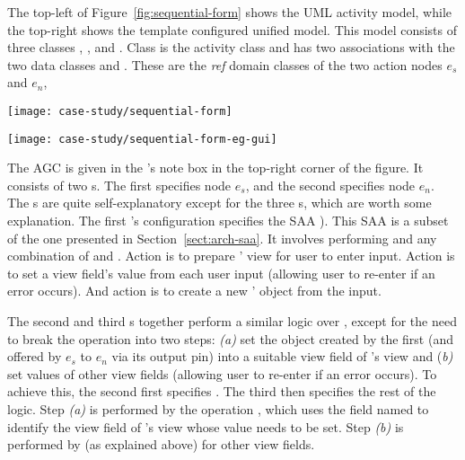 The top-left of Figure~\ref{fig:sequential-form} shows the UML activity model, while the top-right shows the template configured unified model.
This model consists of three classes , , and . Class  is the activity class and has two associations with the two data classes  and . These are the \textit{ref} domain classes of the two action nodes $ e_s $ and $ e_n $, \resp

\begin{figure*}[ht]
\begin{center}
\texttt{[image: case-study/sequential-form]}
\end{center}
\caption{The sequential pattern form.} %
\label{fig:sequential-form}
\end{figure*}
%
\begin{figure*}[ht]
\begin{center}
\texttt{[image: case-study/sequential-form-eg-gui]}
\end{center}
\caption{The sequential pattern form view of enrolment management activity.} %
\label{fig:sequential-form-eg-gui}
\end{figure*}

The AGC is given in the 's note box in the top-right corner of the figure. It consists of two s. The first  specifies node $ e_s $, and the second specifies node $ e_n $. The s are quite self-explanatory except for the three s, which are worth some explanation. The first 's configuration specifies the SAA ). This SAA is a subset of the one presented in Section~\ref{sect:arch-saa}. It involves performing  and any combination of  and . Action  is to prepare ' view for user to enter input. Action  is to set a view field's value from each user input (allowing user to re-enter if an error occurs). And action  is to create a new ' object from the input.

The second and third s together perform a similar logic over , except for the need to break the  operation into two steps: \textit{(a)} set the  object created by the first  (and offered by $ e_s $ to $ e_n $ via its output pin) into a suitable view field of 's view and (\textit{b)} set values of other view fields (allowing user to re-enter if an error occurs). To achieve this, the second  first specifies . The third  then specifies the rest of the logic. Step \textit{(a)} is performed by the operation , which uses the field named  to identify the view field of 's view whose value needs to be set. Step \textit{(b)} is performed by  (as explained above) for other view fields.
%

